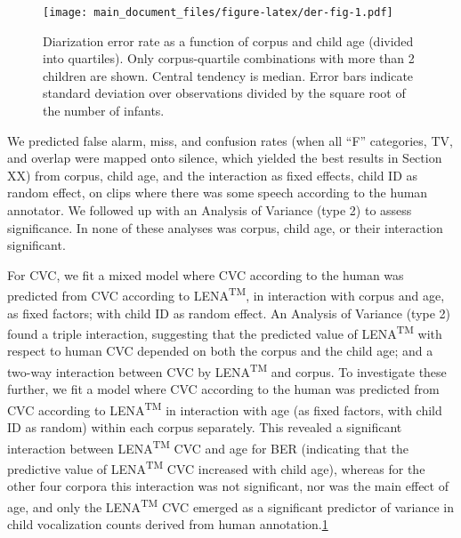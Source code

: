 \documentclass[english,floatsintext,man]{apa6}
\begin{document}
\begin{figure}
\centering
\texttt{[image: main\_document\_files/figure-latex/der-fig-1.pdf]}
\caption{\label{fig:der-fig}Diarization error rate as a function of corpus
and child age (divided into quartiles). Only corpus-quartile
combinations with more than 2 children are shown. Central tendency is
median. Error bars indicate standard deviation over observations divided
by the square root of the number of infants.}
\end{figure}

We predicted false alarm, miss, and confusion rates (when all
\enquote{F} categories, TV, and overlap were mapped onto silence, which
yielded the best results in Section XX) from corpus, child age, and the
interaction as fixed effects, child ID as random effect, on clips where
there was some speech according to the human annotator. We followed up
with an Analysis of Variance (type 2) to assess significance. In none of
these analyses was corpus, child age, or their interaction significant.

For CVC, we fit a mixed model where CVC according to the human was
predicted from CVC according to LENA\textsuperscript{TM}, in interaction
with corpus and age, as fixed factors; with child ID as random effect.
An Analysis of Variance (type 2) found a triple interaction, suggesting
that the predicted value of LENA\textsuperscript{TM} with respect to
human CVC depended on both the corpus and the child age; and a two-way
interaction between CVC by LENA\textsuperscript{TM} and corpus. To
investigate these further, we fit a model where CVC according to the
human was predicted from CVC according to LENA\textsuperscript{TM} in
interaction with age (as fixed factors, with child ID as random) within
each corpus separately. This revealed a significant interaction between
LENA\textsuperscript{TM} CVC and age for BER (indicating that the
predictive value of LENA\textsuperscript{TM} CVC increased with child
age), whereas for the other four corpora this interaction was not
significant, nor was the main effect of age, and only the
LENA\textsuperscript{TM} CVC emerged as a significant predictor of
variance in child vocalization counts derived from human
annotation.\href{For\%20both\%20BER\%20and\%20WAR,\%20the\%20variance\%20associated\%20to\%20the\%20child\%20ID\%20random\%20factor\%20was\%20zero.\%20This\%20suggests\%20a\%20mixed\%20model\%20was\%20not\%20necessary,\%20as\%20child\%20ID\%20is\%20not\%20explaining\%20any\%20additional\%20variance,\%20but\%20it\%20does\%20not\%20alter\%20the\%20interpretation\%20in\%20the\%20main\%20text.}{1}
\end{document}
